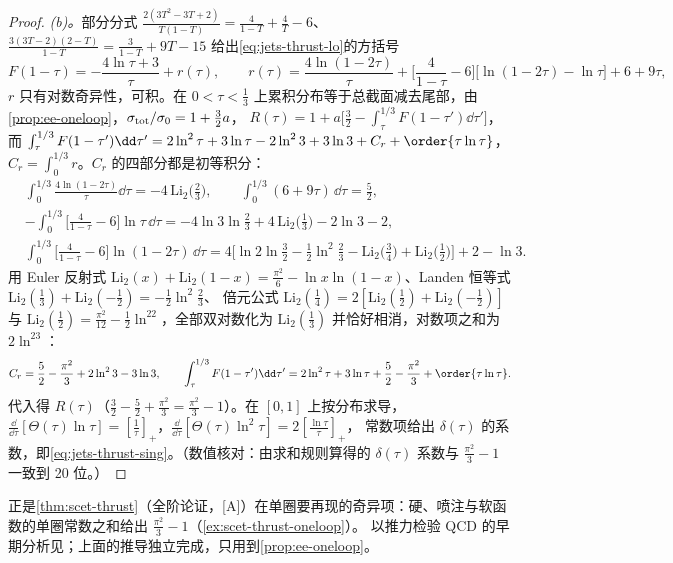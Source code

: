 \begin{proof}
\emph{(b)。}部分分式 $\frac{2(3T^2-3T+2)}{T(1-T)}=\frac{4}{1-T}+\frac4T-6$、$\frac{3(3T-2)(2-T)}{1-T}=\frac{3}{1-T}+9T-15$ 给出\cref{eq:jets-thrust-lo}的方括号
\begin{equation}\label{eq:jets-F-split}
F(1-\tau)=-\frac{4\ln\tau+3}{\tau}+r(\tau),\qquad
r(\tau)=\frac{4\ln(1-2\tau)}{\tau}+\Big[\frac{4}{1-\tau}-6\Big]\big[\ln(1-2\tau)-\ln\tau\big]+6+9\tau ,
\end{equation}
$r$ 只有对数奇异性，可积。在 $0<\tau<\frac13$ 上累积分布等于总截面减去尾部，由\cref{prop:ee-oneloop}，$\sigma_{\rm tot}/\sigma_0=1+\frac32a$，
$R(\tau)=1+a\big[\frac32-\int_\tau^{1/3}F(1-\tau')\dd\tau'\big]$，而
$\int_\tau^{1/3}F(1-\tau')\dd\tau'=2\ln^2\tau+3\ln\tau-2\ln^23+3\ln3+C_r+\order{\tau\ln\tau}$，$C_r=\int_0^{1/3}r$。$C_r$ 的四部分都是初等积分：
\[
\begin{aligned}
&\int_0^{1/3}\frac{4\ln(1-2\tau)}{\tau}\dd\tau=-4\,\mathrm{Li}_2\big(\tfrac23\big),\qquad \int_0^{1/3}(6+9\tau)\,\dd\tau=\tfrac52,\\
&-\int_0^{1/3}\Big[\frac{4}{1-\tau}-6\Big]\ln\tau\,\dd\tau=-4\ln3\ln\tfrac23+4\,\mathrm{Li}_2\big(\tfrac13\big)-2\ln3-2,\\
&\int_0^{1/3}\Big[\frac{4}{1-\tau}-6\Big]\ln(1-2\tau)\,\dd\tau=4\Big[\ln2\ln\tfrac32-\tfrac12\ln^2\tfrac23-\mathrm{Li}_2\big(\tfrac34\big)+\mathrm{Li}_2\big(\tfrac12\big)\Big]+2-\ln3 .
\end{aligned}
\]
用 Euler 反射式 $\mathrm{Li}_2(x)+\mathrm{Li}_2(1-x)=\frac{\pi^2}{6}-\ln x\ln(1-x)$、Landen 恒等式 $\mathrm{Li}_2(\frac13)+\mathrm{Li}_2(-\frac12)=-\frac12\ln^2\frac23$、
倍元公式 $\mathrm{Li}_2(\frac14)=2[\mathrm{Li}_2(\frac12)+\mathrm{Li}_2(-\frac12)]$ 与 $\mathrm{Li}_2(\frac12)=\frac{\pi^2}{12}-\frac12\ln^22$，全部双对数化为 $\mathrm{Li}_2(\frac13)$ 并恰好相消，对数项之和为 $2\ln^23$：
\begin{equation}\label{eq:jets-Cr}
C_r=\frac52-\frac{\pi^2}{3}+2\ln^23-3\ln3 ,\qquad
\int_\tau^{1/3}F(1-\tau')\dd\tau'=2\ln^2\tau+3\ln\tau+\frac52-\frac{\pi^2}{3}+\order{\tau\ln\tau}.
\end{equation}
代入得 $R(\tau)$（$\frac32-\frac52+\frac{\pi^2}{3}=\frac{\pi^2}{3}-1$）。在 $[0,1]$ 上按分布求导，$\frac{\dd}{\dd\tau}[\Theta(\tau)\ln\tau]=[\frac1\tau]_+$，$\frac{\dd}{\dd\tau}[\Theta(\tau)\ln^2\tau]=2[\frac{\ln\tau}{\tau}]_+$，
常数项给出 $\delta(\tau)$ 的系数，即\cref{eq:jets-thrust-sing}。（数值核对：由求和规则算得的 $\delta(\tau)$ 系数与 $\frac{\pi^2}{3}-1$ 一致到 20 位。）
\end{proof}

正是\cref{thm:scet-thrust}（全阶论证，[A]）在单圈要再现的奇异项：硬、喷注与软函数的单圈常数之和给出 $\frac{\pi^2}{3}-1$（\cref{ex:scet-thrust-oneloop}）。
以推力检验 QCD 的早期分析见\cite{Farhi1977,DeRujula:1978vmq}；上面的推导独立完成，只用到\cref{prop:ee-oneloop}。

